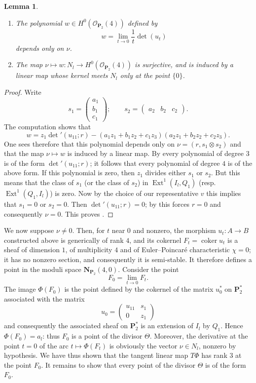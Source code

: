 \documentclass[12pt,english]{smfart}%
\theoremstyle{plain}
\newtheorem{lemma}[theorem]{Lemma}
\theoremstyle{definition}
\theoremstyle{remark}
\newcommand{\PP}{\mathbf{P}}
\newcommand{\Pd}{\PP_{2}^{*}}          %
\newcommand{\NN}{\mathbf{N}}           %
\newcommand{\Oo}{\mathcal{O}}
\DeclareMathOperator{\Ext}{Ext}
\DeclareMathOperator{\coker}{coker}
\newcommand{\origpage}[1]{\marginnote{\scriptsize\itshape p.~#1}}
\begin{document}
\begin{lemma}\label{lem:w-poly}\
\begin{enumerate}
\item[(i)] The polynomial $w\in H^0(\Oo_{\PP_2}(4))$ defined by
\[
w = \lim_{t\to 0}\frac1t \det(u_t)
\]
depends only on $\nu$.
\item[(ii)] The map $\nu\mapsto w: N_l\to H^0(\Oo_{\PP_2}(4))$ is surjective, and is induced by a linear map whose kernel meets $N_l$ only at the point $\{0\}$.
\end{enumerate}
\end{lemma}

\begin{proof}
Write
\[
s_1 = \begin{pmatrix} a_1\\ b_1\\ c_1\end{pmatrix};\qquad
s_2 = \begin{pmatrix} a_2 & b_2 & c_2\end{pmatrix}.
\]
The computation shows that
\[
w = z_1\det{}'(u_{11};r) - (a_1z_1 + b_1z_2 + c_1z_3)(a_2z_1+b_2z_2+c_2z_3).
\]
One sees therefore that this polynomial depends only on $\nu = (r, s_1\otimes s_2)$ and that the map $\nu\mapsto w$ is induced by a linear map. By  every polynomial of degree $3$ is of the form $\det'(u_{11};r)$; it follows that every polynomial of degree $4$ is of the above form. If this polynomial is zero, then $z_1$ divides either $s_1$ or $s_2$. But this means that the class of $s_1$ (or the class of $s_2$) in $\Ext^1(I_l,Q_1)$ (resp.\ $\Ext^1(Q_1,I_l)$) is zero. Now by the choice of our representative $v$ this implies that $s_1=0$ or $s_2=0$. Then $\det'(u_{11};r)=0$; by  this forces $r=0$ and consequently $\nu=0$. This proves .
\end{proof}

We now suppose $\nu\neq 0$. Then, for $t$ near $0$ and nonzero, the morphism $u_t:A\to B$ constructed above is generically of rank $4$, and its cokernel $F_t=\coker u_t$ is a sheaf of dimension $1$, of multiplicity $4$ and of Euler--Poincar\'e characteristic $\chi=0$; it has no nonzero section, and consequently it is semi-stable. It therefore defines a point in the moduli space $\NN_{\PP_2}(4,0)$. Consider the point
\[
F_0 = \lim_{t\to 0}F_t .
\]
\origpage{668}%
The image $\Phi(F_0)$ is the point defined by the cokernel of the matrix $u_0^{*}$ on $\Pd$ associated with the matrix
\[
u_0 = \begin{pmatrix} u_{11} & s_1\\ 0 & z_1\end{pmatrix}
\]
and consequently the associated sheaf on $\Pd$ is an extension of $I_l$ by $Q_1$. Hence $\Phi(F_0)=a_l$: thus $F_0$ is a point of the divisor $\Theta$. Moreover, the derivative at the point $t=0$ of the arc $t\mapsto \Phi(F_t)$ is obviously the vector $\nu\in N_l$, nonzero by hypothesis. We have thus shown that the tangent linear map $T\Phi$ has rank $3$ at the point $F_0$. It remains to show that every point of the divisor $\Theta$ is of the form $F_0$.
\end{document}
